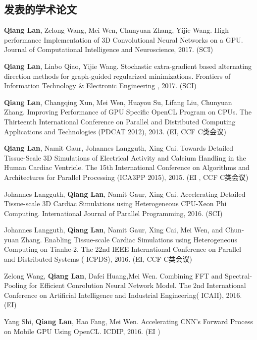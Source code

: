 \begin{resume}

  \section*{发表的学术论文} %

  \begin{enumerate}[{[}1{]}]
  \addtolength{\itemsep}{-.36\baselineskip}%
  \item \textbf{Qiang Lan}, Zelong Wang, Mei Wen, Chunyuan Zhang, Yijie Wang.
  High performance Implementation of 3D Convolutional Neural Networks on a GPU.
  Journal of Computational Intelligence and Neuroscience, 2017.
  (SCI)
    \item \textbf{Qiang Lan}, Linbo Qiao, Yijie Wang.
  Stochastic extra-gradient based alternating direction methods for graph-guided regularized minimizations.
  Frontiers of Information Technology \& Electronic Engineering , 2017.
  (SCI)
  \item \textbf{Qiang Lan}, Changqing Xun, Mei Wen, Huayou Su, Lifang Liu, Chunyuan Zhang.
  Improving Performance of GPU Specific OpenCL Program on CPUs.
  The Thirteenth International Conference on Parallel and Distributed Computing Applications and Technologies (PDCAT 2012), 2013.
  (EI, CCF C类会议)
    \item \textbf{Qiang Lan}, Namit Gaur, Johannes Langguth, Xing Cai.
  Towards Detailed Tissue-Scale 3D Simulations of Electrical Activity and Calcium Handling  in the Human Cardiac Ventricle.
  The 15th International Conference on Algorithms and Architectures for Parallel Processing (ICA3PP 2015), 2015.
  (EI , CCF C类会议)
      \item Johannes Langguth, \textbf{Qiang Lan}, Namit Gaur, Xing Cai.
  Accelerating Detailed Tissue-scale 3D Cardiac Simulations using Heterogeneous CPU-Xeon Phi Computing.
  International Journal of Parallel Programming, 2016.
  (SCI)
   \item  Johannes Langguth, \textbf{Qiang Lan}, Namit Gaur, Xing Cai, Mei Wen, and Chun-yuan Zhang.
  Enabling Tissue-scale Cardiac Simulations using Heterogeneous Computing on Tianhe-2.
  The 22nd IEEE International Conference on Parallel and Distributed Systems ( ICPDS), 2016.
  (EI, CCF C类会议)
  \item Zelong Wang, \textbf{Qiang Lan}, Dafei Huang,Mei Wen.
  Combining FFT and Spectral-Pooling for Efficient Conrolution Neural Network Model.
 The 2nd International Conference on Artificial Intelligence and Industrial Engineering( ICAII), 2016.
  (EI)
 \item Yang Shi, \textbf{Qiang Lan}, Hao Fang, Mei Wen.
  Accelerating CNN’s Forward Process on Mobile GPU Using OpenCL.  ICDIP, 2016.
  (EI )
    \end{enumerate}
    

\end{resume}
